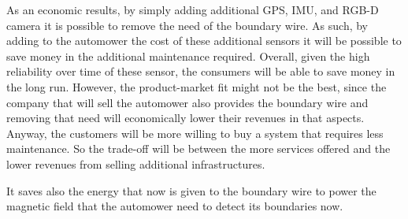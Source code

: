 As an economic results, by simply adding additional GPS, IMU, and RGB-D camera it is possible to remove the need of the boundary wire.
As such, by adding to the automower the cost of these additional sensors it will be possible to save money in the additional maintenance required.
Overall, given the high reliability over time of these sensor, the consumers will be able to save money in the long run. 
However, the product-market fit might not be the best, since the company that will sell the automower also provides the boundary wire and removing that need will economically lower their revenues in that aspects. Anyway, the customers will be more willing to buy a system that requires less maintenance.
So the trade-off will be between the more services offered and the lower revenues from selling additional infrastructures.

It saves also the energy that now is given to the boundary wire to power the magnetic field that the automower need to detect its boundaries now.



\cleardoublepage
